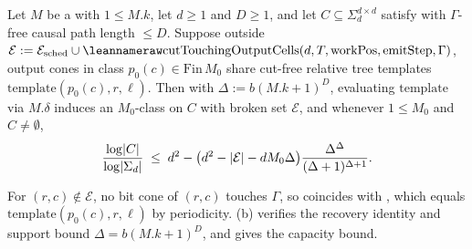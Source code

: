 \begin{theorem}\label{thm:sweep-cut-absorbed}
Let $M$ be a  with $1 \le M.k$, let $d \ge 1$ and $D \ge 1$, and let
$C \subseteq \Sigma_d^{d\times d}$ satisfy  with $\Gamma$-free causal
path length $\le D$. Suppose outside $\mathcal{E} := \mathcal{E}_{\mathrm{sched}} \cup
\lean{cutTouchingOutputCells}(d, T, \mathrm{workPos}, \mathrm{emitStep}, \Gamma)$, output cones in
class $p_0(c) \in \mathrm{Fin}\,M_0$ share cut-free relative tree templates
$\mathrm{template}(p_0(c), r, \ell)$. Then with $\Delta := b(M.k + 1)^D$, evaluating
$\mathrm{template}$ via $M.\delta$ induces an $M_0$-class  on $C$ with
broken set $\mathcal{E}$, and whenever $1 \le M_0$ and $C \ne \emptyset$,
\[
  \frac{\log\lvert C \rvert}{\log\lvert \Sigma_d \rvert}
  \;\le\;
  d^2 - \bigl(d^2 - \lvert \mathcal{E} \rvert - d M_0 \Delta\bigr)
  \frac{\Delta^\Delta}{(\Delta+1)^{\Delta+1}}.
\]
\end{theorem}
\begin{outline}
For $(r,c) \notin \mathcal{E}$, no bit cone of $(r,c)$ touches $\Gamma$, so 
coincides with , which equals $\mathrm{template}(p_0(c), r, \ell)$ by
periodicity. (b) verifies the  recovery identity
and support bound $\Delta = b(M.k+1)^D$, and  gives the capacity bound.
\end{outline}

